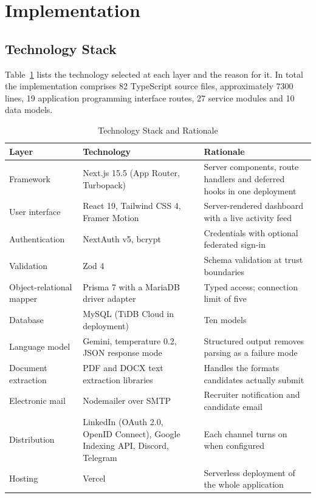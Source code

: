 \documentclass[conference]{IEEEtran}
\begin{document}
\section{Implementation}
\label{sec:implementation}

\subsection{Technology Stack}

Table~\ref{tab:stack} lists the technology selected at each layer and the reason
for it. In total the implementation comprises 82 TypeScript source files,
approximately 7300 lines, 19 application programming interface routes, 27
service modules and 10 data models.

\begin{table}[!t]
\caption{Technology Stack and Rationale}
\label{tab:stack}
\begin{center}
\begin{tabular}{|l|p{5.6cm}|p{6cm}|}
\hline
\textbf{Layer} & \textbf{Technology} & \textbf{Rationale} \\
\hline
Framework & Next.js 15.5 (App Router, Turbopack) & Server components, route handlers and deferred hooks in one deployment \\
\hline
User interface & React 19, Tailwind CSS 4, Framer Motion & Server-rendered dashboard with a live activity feed \\
\hline
Authentication & NextAuth v5, bcrypt & Credentials with optional federated sign-in \\
\hline
Validation & Zod 4 & Schema validation at trust boundaries \\
\hline
Object-relational mapper & Prisma 7 with a MariaDB driver adapter & Typed access; connection limit of five \\
\hline
Database & MySQL (TiDB Cloud in deployment) & Ten models \\
\hline
Language model & Gemini, temperature 0.2, JSON response mode & Structured output removes parsing as a failure mode \\
\hline
Document extraction & PDF and DOCX text extraction libraries & Handles the formats candidates actually submit \\
\hline
Electronic mail & Nodemailer over SMTP & Recruiter notification and candidate email \\
\hline
Distribution & LinkedIn (OAuth 2.0, OpenID Connect), Google Indexing API, Discord, Telegram & Each channel turns on when configured \\
\hline
Hosting & Vercel & Serverless deployment of the whole application \\
\hline
\end{tabular}
\end{center}
\end{table}
\end{document}

